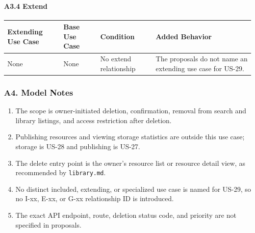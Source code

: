 \documentclass[12pt]{article}
\renewcommand{\baselinestretch}{1.5}
\begin{document}
\hypertarget{sec:a3-4-extend}{}
\paragraph*{A3.4 Extend}
\par\medskip

\begingroup
\small
\renewcommand{\baselinestretch}{1.0}\selectfont
\renewcommand{\arraystretch}{1.15}
\setlength{\tabcolsep}{6pt}
\begin{longtable}{|>{\raggedright\arraybackslash}p{}|>{\raggedright\arraybackslash}p{}|>{\raggedright\arraybackslash}p{}|>{\raggedright\arraybackslash}p{}|}
\hline
\textbf{Extending Use Case} & \textbf{Base Use Case} & \textbf{Condition} & \textbf{Added Behavior} \\ \hline
\endhead
None & None & No extend relationship & The proposals do not name an extending use case for US-29. \\ \hline
\end{longtable}
\endgroup
\par\medskip

\hypertarget{sec:a4-model-notes}{}
\subsubsection*{A4. Model Notes}
\par\medskip

\begin{enumerate}
\item The scope is owner-initiated deletion, confirmation, removal from search and library listings, and access restriction after deletion.
\item Publishing resources and viewing storage statistics are outside this use case; storage is US-28 and publishing is US-27.
\item The delete entry point is the owner's resource list or resource detail view, as recommended by \texttt{library.md}.
\item No distinct included, extending, or specialized use case is named for US-29, so no I-xx, E-xx, or G-xx relationship ID is introduced.
\item The exact API endpoint, route, deletion status code, and priority are not specified in proposals.
\end{enumerate}
\par\medskip

\hypertarget{sec:part-b-use-case-specification}{}
\end{document}
